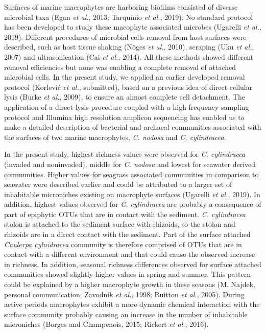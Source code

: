 \documentclass[12pt,]{article}
\begin{document}
Surfaces of marine macrophytes are harboring biofilms consisted of
diverse microbial taxa (Egan \emph{et al.}, 2013; Tarquinio \emph{et
al.}, 2019). No standard protocol has been developed to study these
macophyte associated microbes (Ugarelli \emph{et al.}, 2019). Different
procedures of microbial cells removal from host surfaces were described,
such as host tissue shaking (Nõges \emph{et al.}, 2010), scraping (Uku
\emph{et al.}, 2007) and ultrasonication (Cai \emph{et al.}, 2014). All
these methods showed different removal efficiencies but none was
enabling a complete removal of attached microbial cells. In the present
study, we applied an earlier developed removal protocol (Korlević
\emph{et al.}, submitted), based on a previous idea of direct cellular
lysis (Burke \emph{et al.}, 2009), to ensure an almost complete cell
detachment. The application of a direct lysis procedure coupled with a
high frequency sampling protocol and Illumina high resolution amplicon
sequencing has enabled us to make a detailed description of bacterial
and archaeal communities associated with the surfaces of two marine
macrophytes, \emph{C. nodosa} and \emph{C. cylindracea}.

In the present study, highest richness values were observed for \emph{C.
cylindracea} (invaded and noninvaded), middle for \emph{C. nodosa} and
lowest for seawater derived communities. Higher values for seagrass
associated communities in comparison to seawater were described earlier
and could be attributed to a larger set of inhabitable microniches
existing on macrophyte surfaces (Ugarelli \emph{et al.}, 2019). In
addition, highest values observed for \emph{C. cylindracea} are probably
a consequence of part of epiphytic OTUs that are in contact with the
sediment. \emph{C. cylindracea} stolon is attached to the sediment
surface with rhizoids, so the stolon and rhizoids are in a direct
contact with the sediment. Part of the surface attached \emph{Caulerpa
cylnidracea} community is therefore comprised of OTUs that are in
contact with a different environment and that could cause the observed
increase in richness. In addition, seasonal richness differences
observed for surface attached communities showed slightly higher values
in spring and summer. This pattern could be explained by a higher
macrophyte growth in these seasons (M. Najdek, personal communication;
Zavodnik \emph{et al.}, 1998; Ruitton \emph{et al.}, 2005). During
active periods macrophytes exhibit a more dynamic chemical interaction
with the surface community probably causing an increase in the number of
inhabitable microniches (Borges and Champenois, 2015; Rickert \emph{et
al.}, 2016).
\end{document}
